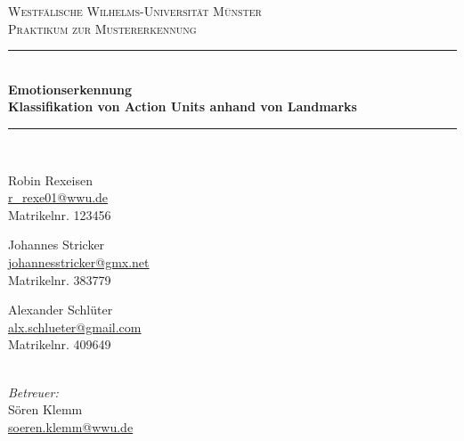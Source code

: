 \begin{titlepage}
	\newcommand{\HRule}{\rule{\linewidth}{0.5mm}} %

	\center %
 

	\textsc{\LARGE Westfälische Wilhelms-Universität Münster}\\[1.5cm] %
	\textsc{\Large Praktikum zur Mustererkennung}\\[0.5cm] %


	\HRule \\[0.4cm]
	
	{\onehalfspacing\huge\sffamily\bfseries Emotionserkennung \\[0.4cm]
    \large Klassifikation von Action Units anhand von Landmarks \singlespacing} %
	\vspace{0.4cm}
	\HRule \\[3cm] 
	
	\begin{minipage}[t]{0.3\textwidth}
	\begin{center} \large
	Robin Rexeisen\\ %
	\normalsize \url{r_rexe01@wwu.de}\\
	Matrikelnr. 123456
	\end{center}
	\end{minipage}
	\quad
	\begin{minipage}[t]{0.3\textwidth}
	\begin{center} \large
	Johannes Stricker\\ 
	\normalsize \url{johannesstricker@gmx.net}\\
	Matrikelnr. 383779
	\end{center}
	\end{minipage}
  \quad
	\begin{minipage}[t]{0.3\textwidth}
	\begin{center} \large
	Alexander Schlüter\\ 
	\normalsize \url{alx.schlueter@gmail.com}\\
	Matrikelnr. 409649
	\end{center}
  \end{minipage}\\[2cm]
  \large
  \emph{Betreuer:}\\
	Sören Klemm\\ 
	\normalsize \url{soeren.klemm@wwu.de}\\


\end{titlepage}
